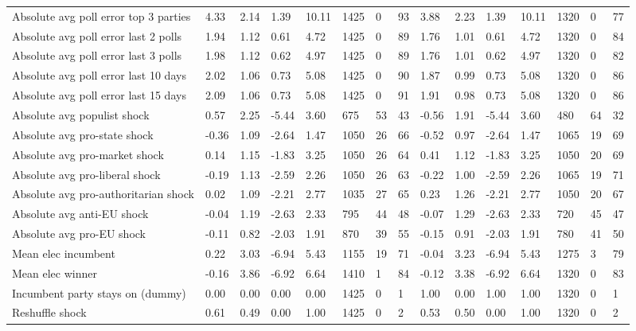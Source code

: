 \begin{longtable}{lllllllllllllll}
Absolute avg poll error top 3 parties & 4.33 & 2.14 & 1.39 & 10.11 & 1425 & 0 & 93 & 3.88 & 2.23 & 1.39 & 10.11 & 1320 & 0 & 77\\
\addlinespace
Absolute avg poll error last 2 polls & 1.94 & 1.12 & 0.61 & 4.72 & 1425 & 0 & 89 & 1.76 & 1.01 & 0.61 & 4.72 & 1320 & 0 & 84\\
Absolute avg poll error last 3 polls & 1.98 & 1.12 & 0.62 & 4.97 & 1425 & 0 & 89 & 1.76 & 1.01 & 0.62 & 4.97 & 1320 & 0 & 82\\
Absolute avg poll error last 10 days & 2.02 & 1.06 & 0.73 & 5.08 & 1425 & 0 & 90 & 1.87 & 0.99 & 0.73 & 5.08 & 1320 & 0 & 86\\
Absolute avg poll error last 15 days & 2.09 & 1.06 & 0.73 & 5.08 & 1425 & 0 & 91 & 1.91 & 0.98 & 0.73 & 5.08 & 1320 & 0 & 86\\
Absolute avg populist shock & 0.57 & 2.25 & -5.44 & 3.60 & 675 & 53 & 43 & -0.56 & 1.91 & -5.44 & 3.60 & 480 & 64 & 32\\
\addlinespace
Absolute avg pro-state shock & -0.36 & 1.09 & -2.64 & 1.47 & 1050 & 26 & 66 & -0.52 & 0.97 & -2.64 & 1.47 & 1065 & 19 & 69\\
Absolute avg pro-market shock & 0.14 & 1.15 & -1.83 & 3.25 & 1050 & 26 & 64 & 0.41 & 1.12 & -1.83 & 3.25 & 1050 & 20 & 69\\
Absolute avg pro-liberal shock & -0.19 & 1.13 & -2.59 & 2.26 & 1050 & 26 & 63 & -0.22 & 1.00 & -2.59 & 2.26 & 1065 & 19 & 71\\
Absolute avg pro-authoritarian shock & 0.02 & 1.09 & -2.21 & 2.77 & 1035 & 27 & 65 & 0.23 & 1.26 & -2.21 & 2.77 & 1050 & 20 & 67\\
Absolute avg anti-EU shock & -0.04 & 1.19 & -2.63 & 2.33 & 795 & 44 & 48 & -0.07 & 1.29 & -2.63 & 2.33 & 720 & 45 & 47\\
\addlinespace
Absolute avg pro-EU shock & -0.11 & 0.82 & -2.03 & 1.91 & 870 & 39 & 55 & -0.15 & 0.91 & -2.03 & 1.91 & 780 & 41 & 50\\
Mean elec incumbent & 0.22 & 3.03 & -6.94 & 5.43 & 1155 & 19 & 71 & -0.04 & 3.23 & -6.94 & 5.43 & 1275 & 3 & 79\\
Mean elec winner & -0.16 & 3.86 & -6.92 & 6.64 & 1410 & 1 & 84 & -0.12 & 3.38 & -6.92 & 6.64 & 1320 & 0 & 83\\
Incumbent party stays on (dummy) & 0.00 & 0.00 & 0.00 & 0.00 & 1425 & 0 & 1 & 1.00 & 0.00 & 1.00 & 1.00 & 1320 & 0 & 1\\
Reshuffle shock & 0.61 & 0.49 & 0.00 & 1.00 & 1425 & 0 & 2 & 0.53 & 0.50 & 0.00 & 1.00 & 1320 & 0 & 2\\

\end{longtable}
